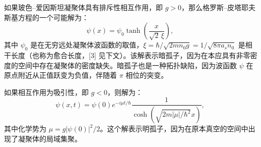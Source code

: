 如果玻色–爱因斯坦凝聚体具有排斥性相互作用，即 $g > 0$，那么格罗斯–皮塔耶夫斯基方程的一个可能解为：
$$
\psi(x) = \psi_0 \tanh\left( \frac{x}{\sqrt{2} \, \xi} \right),~
$$
其中 $\psi_0$ 是在无穷远处凝聚体波函数的取值，$\xi = \hbar/\sqrt{2 m n_0 g} = 1/\sqrt{8\pi a_s n_0}$ 是相干长度（也称为愈合长度，[3] 见下文）。该解表示暗孤子，因为在本应具有非零密度的空间中存在凝聚体的密度缺失。暗孤子也是一种拓扑缺陷，因为波函数 $\psi$ 在原点附近从正值跃变为负值，伴随着 $\pi$ 相位的突变。

如果相互作用为吸引性，即 $g < 0$，则解为：
$$
\psi(x, t) = \psi(0) e^{-i\mu t / \hbar} \frac{1}{\cosh\left( \sqrt{2m|\mu|/\hbar^2} x \right)},~
$$
其中化学势为 $\mu = g |\psi(0)|^2/2$。这个解表示明孤子，因为在原本真空的空间中出现了凝聚体的局域集聚。
